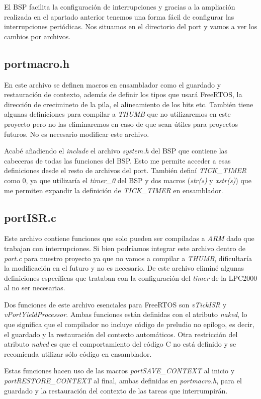 El BSP facilita la configuración de interrupciones y gracias a la ampliación realizada en el apartado anterior tenemos una forma fácil de configurar las interrupciones periódicas. Nos situamos en el directorio del port y vamos a ver los cambios por archivos.

\subsection{portmacro.h}
En este archivo se definen macros en ensamblador como el guardado y restauración de contexto, además de definir los tipos que usará FreeRTOS, la dirección de crecimineto de la pila, el alineamiento de los bits etc. También tiene algunas definiciones para compilar a \emph{THUMB} que no utilizaremos en este proyecto pero no las eliminaremos en caso de que sean útiles para proyectos futuros. No es necesario modificar este archivo.

Acabé añadiendo el \emph{include} el archivo \emph{system.h} del BSP que contiene las cabeceras de todas las funciones del BSP. Esto me permite acceder a esas definiciones desde el resto de archivos del port. También definí \emph{TICK\_TIMER} como 0, ya que utilizaría el \emph{timer\_0} del BSP y dos macros (\emph{str(s)} y \emph{xstr(s)}) que me permiten expandir la definición de \emph{TICK\_TIMER} en ensamblador.

\subsection{portISR.c}
Este archivo contiene funciones que solo pueden ser compiladas a \emph{ARM} dado que trabajan con interrupciones. Si bien podríamos integrar este archivo dentro de \emph{port.c} para nuestro proyecto ya que no vamos a compilar a \emph{THUMB}, dificultaría la modificación en el futuro y no es necesario. De este archivo eliminé algunas definiciones específicas que trataban con la configuración del \emph{timer} de la LPC2000 al no ser necesarias.

Dos funciones de este archivo esenciales para FreeRTOS son \emph{vTickISR} y \emph{vPortYieldProcessor}. Ambas funciones están definidas con el atributo \emph{naked}, lo que significa que el compilador no incluye código de preludio no epílogo, es decir, el guardado y la restauración del contexto automáticos. Otra restricción del atributo \emph{naked} es que el comportamiento del código C no está definido y se recomienda utilizar sólo código en ensamblador.

Estas funciones hacen uso de las macros \emph{portSAVE\_CONTEXT} al inicio y \emph{portRESTORE\_CONTEXT} al final, ambas definidas en \emph{portmacro.h}, para el guardado y la restauración del contexto de las tareas que interrumpirán.

